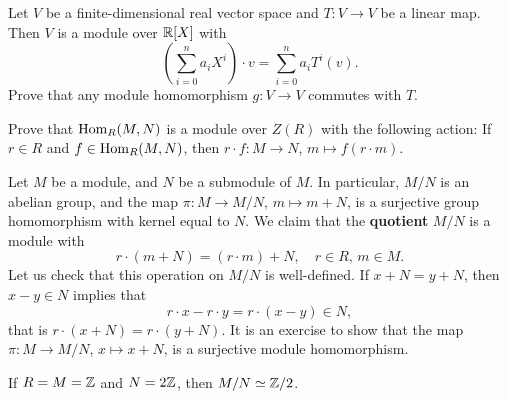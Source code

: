 \begin{exercise}
\label{xca:commuting}
Let $V$ be a finite-dimensional real vector space and $T\colon V\to V$ be a linear map. Then 
$V$ is a module over $\mathbb{R}[X]$ with  
\[
\left(\sum_{i=0}^n a_iX^i\right)\cdot v=\sum_{i=0}^n a_iT^i(v).
\]
Prove that any module homomorphism $g\colon V\to V$ commutes with $T$. 
\end{exercise}

\begin{exercise}
\label{xca:Hom}
Prove that $\operatorname{Hom}_R(M,N)$ is a module over $Z(R)$ with the following action: If $r\in R$ and
$f\in\operatorname{Hom}_R(M,N)$, then $r\cdot f\colon M\to N$, $m\mapsto f(r\cdot m)$. 
\end{exercise}

Let $M$ be a module, and $N$ be a submodule of $M$. In particular, $M/N$ is an abelian group, and the map $\pi\colon M\to M/N$, $m\mapsto m+N$, is a surjective group homomorphism with kernel equal to $N$. We claim
that the \textbf{quotient} $M/N$ is a module with  
\[
r\cdot (m+N)=(r\cdot m)+N,\quad
r\in R,\,m\in M. 
\]
Let us check that this operation on $M/N$ is well-defined. If $x+N=y+N$, then
$x-y\in N$ implies that  
\[
r\cdot x-r\cdot y=r\cdot (x-y)\in N,
\]
that is $r\cdot (x+N)=r\cdot (y+N)$. It is an exercise to show that
the map $\pi\colon M\to M/N$, $x\mapsto x+N$, is a 
surjective module homomorphism. 

\begin{example}
If $R=M=\mathbb{Z}$ and $N=2\mathbb{Z}$, then $M/N\simeq\mathbb{Z}/2$. 
\end{example}

